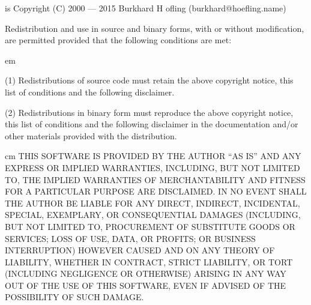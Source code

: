 
{\CRISP} is Copyright (C) 2000 --- 2015 Burkhard H{ o}fling
(burkhard@hoefling.name)

Redistribution and use in source and binary forms, with or without
modification, are permitted provided that the following conditions are
met:
\medskip

{ em
\item{(1)} Redistributions of source code must retain the above copyright
    notice, this list of conditions and the following disclaimer. 

\item{(2)} Redistributions in binary form must reproduce the above copyright
    notice, this list of conditions and the following disclaimer in
    the documentation and/or other materials provided with the
    distribution. \par}
\medskip
    
{ cm 
THIS SOFTWARE IS PROVIDED BY THE AUTHOR ``AS IS'' AND ANY EXPRESS OR
IMPLIED WARRANTIES, INCLUDING, BUT NOT LIMITED TO, THE IMPLIED
WARRANTIES OF MERCHANTABILITY AND FITNESS FOR A PARTICULAR PURPOSE ARE
DISCLAIMED. IN NO EVENT SHALL THE AUTHOR BE LIABLE FOR ANY DIRECT,
INDIRECT, INCIDENTAL, SPECIAL, EXEMPLARY, OR CONSEQUENTIAL DAMAGES
(INCLUDING, BUT NOT LIMITED TO, PROCUREMENT OF SUBSTITUTE GOODS OR
SERVICES; LOSS OF USE, DATA, OR PROFITS; OR BUSINESS INTERRUPTION)
HOWEVER CAUSED AND ON ANY THEORY OF LIABILITY, WHETHER IN CONTRACT,
STRICT LIABILITY, OR TORT (INCLUDING NEGLIGENCE OR OTHERWISE) ARISING
IN ANY WAY OUT OF THE USE OF THIS SOFTWARE, EVEN IF ADVISED OF THE
POSSIBILITY OF SUCH DAMAGE.\par}

